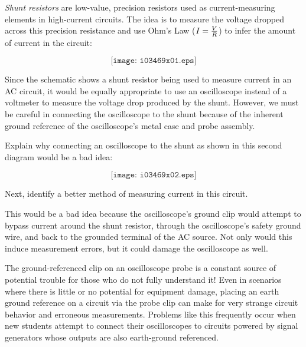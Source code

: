 

{\it Shunt resistors} are low-value, precision resistors used as current-measuring elements in high-current circuits.  The idea is to measure the voltage dropped across this precision resistance and use Ohm's Law ($I = {V \over R}$) to infer the amount of current in the circuit:

$$\texttt{[image: i03469x01.eps]}$$

Since the schematic shows a shunt resistor being used to measure current in an AC circuit, it would be equally appropriate to use an oscilloscope instead of a voltmeter to measure the voltage drop produced by the shunt.  However, we must be careful in connecting the oscilloscope to the shunt because of the inherent ground reference of the oscilloscope's metal case and probe assembly.

Explain why connecting an oscilloscope to the shunt as shown in this second diagram would be a bad idea:

$$\texttt{[image: i03469x02.eps]}$$

Next, identify a better method of measuring current in this circuit.







This would be a bad idea because the oscilloscope's ground clip would attempt to bypass current around the shunt resistor, through the oscilloscope's safety ground wire, and back to the grounded terminal of the AC source.  Not only would this induce measurement errors, but it could damage the oscilloscope as well.

The ground-referenced clip on an oscilloscope probe is a constant source of potential trouble for those who do not fully understand it!  Even in scenarios where there is little or no potential for equipment damage, placing an earth ground reference on a circuit via the probe clip can make for very strange circuit behavior and erroneous measurements.  Problems like this frequently occur when new students attempt to connect their oscilloscopes to circuits powered by signal generators whose outputs are also earth-ground referenced.

